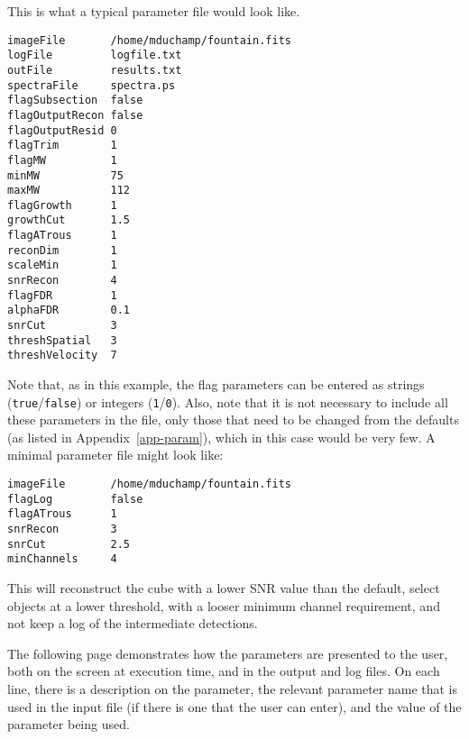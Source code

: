\label{app-input}

This is what a typical parameter file would look like.

\begin{verbatim}
imageFile       /home/mduchamp/fountain.fits
logFile         logfile.txt
outFile         results.txt
spectraFile     spectra.ps
flagSubsection  false
flagOutputRecon false
flagOutputResid 0
flagTrim        1
flagMW          1
minMW           75
maxMW           112
flagGrowth      1
growthCut       1.5
flagATrous      1
reconDim        1          
scaleMin        1
snrRecon        4
flagFDR         1
alphaFDR        0.1
snrCut          3
threshSpatial   3
threshVelocity  7
\end{verbatim}

Note that, as in this example, the flag parameters can be entered as
strings (\texttt{true}/\texttt{false}) or integers
(\texttt{1}/\texttt{0}). Also, note that it is not necessary to
include all these parameters in the file, only those that need to be
changed from the defaults (as listed in Appendix~\ref{app-param}),
which in this case would be very few. A minimal parameter file might
look like:
\begin{verbatim}
imageFile       /home/mduchamp/fountain.fits
flagLog         false
flagATrous      1
snrRecon        3
snrCut          2.5
minChannels     4
\end{verbatim}
This will reconstruct the cube with a lower SNR value than the
default, select objects at a lower threshold,  with a looser minimum
channel requirement, and not keep a log of the intermediate
detections. 

The following page demonstrates how the parameters are presented to
the user, both on the screen at execution time, and in the output and
log files. On each line, there is a description on the parameter, the
relevant parameter name that is used in the input file (if there is
one that the user can enter), and the value of the parameter being
used.

